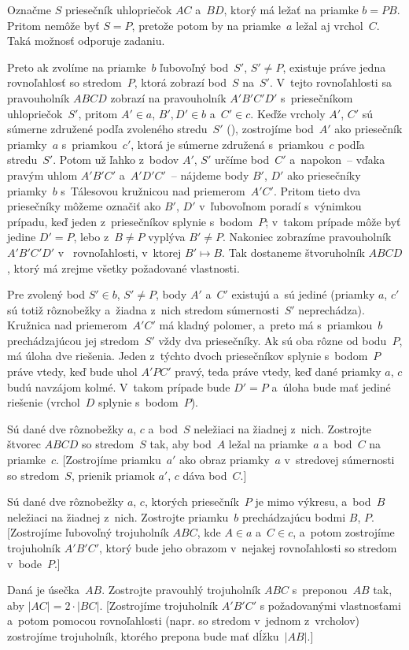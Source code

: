 {%
Označme $S$ priesečník uhlopriečok $AC$ a~$BD$, ktorý má ležať na
priamke $b=PB$. Pritom nemôže byť $S=P$, pretože potom by na priamke~$a$ ležal aj vrchol~$C$.
Taká možnosť odporuje zadaniu.

Preto ak zvolíme na priamke~$b$ ľubovoľný bod~$S'$, $S'\ne P$, existuje práve
jedna rovnoľahlosť so stredom~$P$, ktorá zobrazí bod~$S$  na~$S'$. V~tejto
rovnoľahlosti sa pravouholník $ABCD$ zobrazí na pravouholník $A'B'C'D'$
s~priesečníkom uhlopriečok~$S'$, pritom $A'\in a$, $B',D'\in b$ a~$C'\in c$.
Keďže vrcholy $A'$, $C'$ sú súmerne združené podľa zvoleného stredu~$S'$
(\obr), zostrojíme bod~$A'$ ako priesečník priamky~$a$ s~priamkou~$c'$, ktorá je
súmerne združená s~priamkou~$c$ podľa stredu~$S'$. Potom už ľahko z~bodov
$A'$, $S'$ určíme bod~$C'$ a~napokon~-- vďaka pravým uhlom $A'B'C'$
a~$A'D'C'$~-- nájdeme body $B'$, $D'$ ako priesečníky priamky~$b$ s~Tálesovou kružnicou nad priemerom~$A'C'$.
Pritom tieto dva priesečníky môžeme označiť ako $B'$, $D'$ v~ľubovoľnom poradí
s~výnimkou prípadu, keď jeden z~priesečníkov splynie s~bodom~$P$; v~takom prípade môže
byť jedine $D'=P$, lebo z~$B\ne P$ vyplýva $B'\ne P$. Nakoniec zobrazíme pravouholník
$A'B'C'D'$ v~ rovnoľahlosti, v~ktorej $B'\mapsto B$. Tak
dostaneme štvoruholník $ABCD$, ktorý má zrejme všetky požadované vlastnosti.
%

\diskusia
Pre zvolený bod $S'\in b$, $S'\ne P$, body $A'$ a~$C'$
existujú a~sú jediné (priamky $a$, $c'$ sú totiž rôznobežky a~žiadna z~nich
stredom súmernosti~$S'$ neprechádza). Kružnica nad priemerom~$A'C'$ má kladný
polomer, a~preto má s~priamkou~$b$ prechádzajúcou jej stredom~$S'$ vždy dva
priesečníky. Ak sú oba rôzne od bodu~$P$, má úloha dve riešenia. Jeden
z~týchto dvoch priesečníkov splynie s~bodom~$P$ práve vtedy, keď bude uhol $A'PC'$
pravý, teda práve vtedy, keď dané priamky $a$, $c$ budú navzájom kolmé. V~takom prípade bude
$D'=P$ a~úloha bude mať jediné riešenie (vrchol~$D$ splynie s~bodom~$P$).

Sú dané dve rôznobežky $a$, $c$ a~bod~$S$ neležiaci na žiadnej z~nich.
Zostrojte štvorec $ABCD$ so stredom~$S$ tak, aby bod~$A$ ležal na priamke~$a$
a~bod~$C$ na priamke~$c$. [Zostrojíme priamku~$a'$ ako obraz priamky~$a$
v~stredovej súmernosti so stredom~$S$, prienik priamok $a'$, $c$ dáva bod~$C$.]

Sú dané dve rôznobežky $a$, $c$, ktorých priesečník~$P$ je
mimo výkresu, a~bod~$B$ neležiaci na žiadnej z~nich. Zostrojte priamku~$b$
prechádzajúcu bodmi $B$, $P$. [Zostrojíme ľubovoľný trojuholník $ABC$, kde
$A\in a$ a~$C\in c$, a~potom zostrojíme trojuholník $A'B'C'$, ktorý bude jeho obrazom
v~nejakej rovnoľahlosti so stredom v~bode~$P$.]

Daná je úsečka~$AB$. Zostrojte pravouhlý trojuholník $ABC$ s~preponou~$AB$ tak, aby $|AC|=2\cdot |BC|$. [Zostrojíme trojuholník
$A'B'C'$ s požadovanými vlastnosťami a~potom pomocou rovnoľahlosti
(napr. so stredom v~jednom z~vrcholov) zostrojíme trojuholník, ktorého
prepona bude mať dĺžku~$|AB|$.]
}

